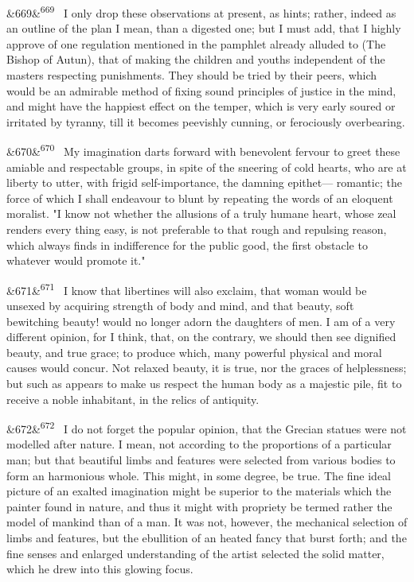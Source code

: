 \documentclass[12pt]{article}
\newcommand{\para}[1][]{\par\noindent\ifx&#1&\else\textsuperscript{\footnotesize #1}~\fi}
\begin{document}
\para[669] I only drop these observations at present, as hints; rather, indeed as an outline of the plan I mean, than a digested one; but I must add, that I highly approve of one regulation mentioned in the pamphlet already alluded to (The Bishop of Autun), that of making the children and youths independent of the masters respecting punishments. They should be tried by their peers, which would be an admirable method of fixing sound principles of justice in the mind, and might have the happiest effect on the temper, which is very early soured or irritated by tyranny, till it becomes peevishly cunning, or ferociously overbearing.

\para[670] My imagination darts forward with benevolent fervour to greet these amiable and respectable groups, in spite of the sneering of cold hearts, who are at liberty to utter, with frigid self-importance, the damning epithet--- romantic; the force of which I shall endeavour to blunt by repeating the words of an eloquent moralist. "I know not whether the allusions of a truly humane heart, whose zeal renders every thing easy, is not preferable to that rough and repulsing reason, which always finds in indifference for the public good, the first obstacle to whatever would promote it."

\para[671] I know that libertines will also exclaim, that woman would be unsexed by acquiring strength of body and mind, and that beauty, soft bewitching beauty! would no longer adorn the daughters of men. I am of a very different opinion, for I think, that, on the contrary, we should then see dignified beauty, and true grace; to produce which, many powerful physical and moral causes would concur. Not relaxed beauty, it is true, nor the graces of helplessness; but such as appears to make us respect the human body as a majestic pile, fit to receive a noble inhabitant, in the relics of antiquity.

\para[672] I do not forget the popular opinion, that the Grecian statues were not modelled after nature. I mean, not according to the proportions of a particular man; but that beautiful limbs and features were selected from various bodies to form an harmonious whole. This might, in some degree, be true. The fine ideal picture of an exalted imagination might be superior to the materials which the painter found in nature, and thus it might with propriety be termed rather the model of mankind than of a man. It was not, however, the mechanical selection of limbs and features, but the ebullition of an heated fancy that burst forth; and the fine senses and enlarged understanding of the artist selected the solid matter, which he drew into this glowing focus.
\end{document}
